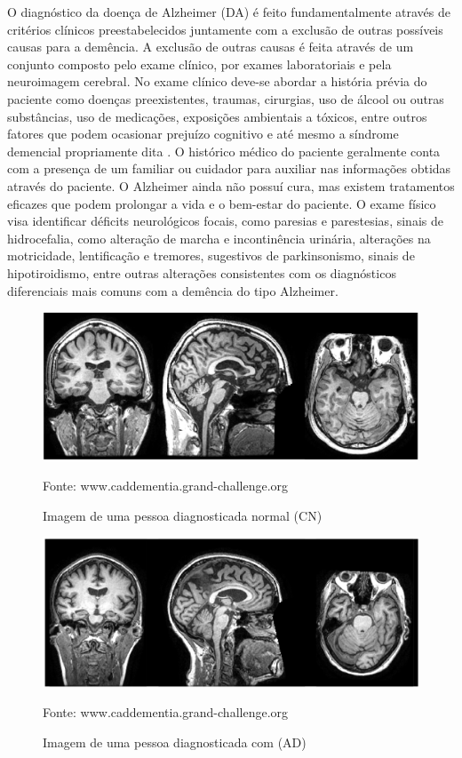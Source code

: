 \documentclass[openright]{UFRGS} %
\begin{document}
O diagnóstico da doença de Alzheimer (DA) é feito fundamentalmente através de critérios clínicos preestabelecidos juntamente com a exclusão de outras possíveis causas para a demência. A exclusão de outras causas é feita através de um conjunto composto pelo exame clínico, por exames
laboratoriais e pela neuroimagem cerebral. No exame clínico deve-se abordar a história prévia do paciente como doenças preexistentes, traumas, cirurgias, uso de
álcool ou outras substâncias, uso de medicações, exposições ambientais a tóxicos, entre outros fatores que podem ocasionar prejuízo cognitivo e até mesmo a síndrome demencial propriamente dita \cite{aprahamian2009doencca}. O histórico médico do paciente geralmente
conta com a presença de um familiar ou cuidador para
auxiliar nas informações obtidas através do paciente.
O Alzheimer ainda não  possuí cura, mas existem tratamentos eficazes que podem prolongar a vida e o bem-estar do paciente. O exame físico visa identificar déficits neurológicos focais,
como paresias e parestesias, sinais de hidrocefalia, como
alteração de marcha e incontinência urinária, alterações
na motricidade, lentificação e tremores, sugestivos de
parkinsonismo, sinais de hipotiroidismo, entre outras
alterações consistentes com os diagnósticos diferenciais
mais comuns com a demência do tipo Alzheimer.



\begin{figure}[h]
    \centering
    \caption{Imagem de uma pessoa diagnosticada normal (CN)}
    \includegraphics[scale=0.31]{acNormal.png}
    \centerline{Fonte: www.caddementia.grand-challenge.org}
    \label{fig:acNormal}
\end{figure}

\begin{figure}[h]
    \centering
    \caption{Imagem de uma pessoa diagnosticada com (AD)}
    \includegraphics[scale=0.35]{adAlzhaimer.png}
    \centerline{Fonte: www.caddementia.grand-challenge.org}
    \label{fig:adAlzhaimer}
\end{figure}
\end{document}
